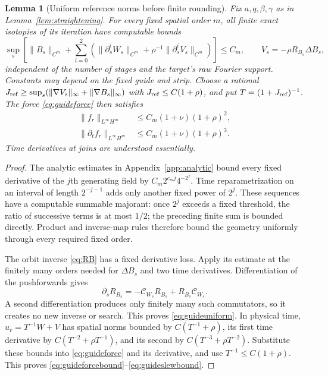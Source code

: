 \documentclass[11pt,a4paper]{amsart}
\newtheorem{lemma}[theorem]{Lemma}
\theoremstyle{definition}
\theoremstyle{remark}
\numberwithin{equation}{section}
\newcommand{\Ccal}{\mathcal C}
\newcommand{\norm}[1]{\lVert #1\rVert}
\begin{document}
\begin{lemma}[Uniform reference norms before finite rounding]\label{lem:guidenorms}
Fix $a,q,\beta,\gamma$ as in Lemma~\ref{lem:straightening}. For every fixed spatial order $m$, all finite exact isotopies of its iteration have computable bounds
\begin{equation}\label{eq:guideuniform}
 \sup_s\left[
 \norm{B_s}_{C^m}
 +\sum_{i=0}^2\left(\norm{\partial_s^iW_s}_{C^m}
                  +\rho^{-1}\norm{\partial_s^iV_s}_{C^m}\right)
 \right]\le C_m,\qquad V_s=-\rho R_{B_s}\Delta B_s,
\end{equation}
independent of the number of stages and the target's raw Fourier support. Constants may depend on the fixed guide and strip. Choose a rational
$J_{\rm ref}\ge\sup_s(\norm{\nabla V_s}_\infty+\norm{\nabla B_s}_\infty)$
with $J_{\rm ref}\le C(1+\rho)$, and put $T=(1+J_{\rm ref})^{-1}$. The force \eqref{eq:guideforce} then satisfies
\begin{align}
 \norm{f_r}_{L^\infty H^m}
       &\le C_m(1+\nu)(1+\rho)^2,\label{eq:guideforcebound}\\
 \norm{\partial_tf_r}_{L^\infty H^m}
       &\le C_m(1+\nu)(1+\rho)^3.\label{eq:guideslewbound}
\end{align}
Time derivatives at joins are understood essentially.
\end{lemma}

\begin{proof}
The analytic estimates in Appendix~\ref{app:analytic} bound every fixed derivative of the $j$th generating field by
$C_m2^{c_mj}4^{-2^j}$. Time reparametrization on an interval of length $2^{-j-1}$ adds only another fixed power of $2^j$. These sequences have a computable summable majorant: once $2^j$ exceeds a fixed threshold, the ratio of successive terms is at most $1/2$; the preceding finite sum is bounded directly. Product and inverse-map rules therefore bound the geometry uniformly through every required fixed order.

The orbit inverse \eqref{eq:RB} has a fixed derivative loss. Apply its estimate at the finitely many orders needed for $\Delta B_s$ and two time derivatives. Differentiation of the pushforwards gives
\begin{equation}\label{eq:inverseprime}
 \partial_sR_{B_s}=-\Ccal_{W_s}R_{B_s}+R_{B_s}\Ccal_{W_s}.
\end{equation}
A second differentiation produces only finitely many such commutators, so it creates no new inverse or search. This proves \eqref{eq:guideuniform}. In physical time,
$u_r=T^{-1}W+V$ has spatial norms bounded by $C(T^{-1}+\rho)$, its first time derivative by $C(T^{-2}+\rho T^{-1})$, and its second by $C(T^{-3}+\rho T^{-2})$. Substitute these bounds into \eqref{eq:guideforce} and its derivative, and use $T^{-1}\le C(1+\rho)$. This proves \eqref{eq:guideforcebound}--\eqref{eq:guideslewbound}.
\end{proof}
\end{document}
